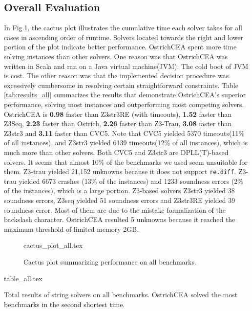 \documentclass{standalone}
\begin{document}
\subsection{Overall Evaluation}
In Fig.\ref{fig:cactus_all}, the cactus plot illustrates the cumulative time each solver takes for all cases in ascending order of runtime. Solvers located towards the right and lower portion of the plot indicate better performance. OstrichCEA spent more time solving instances than other solvers. One reason was that OstrichCEA was written in Scala and ran on a Java virtual machine(JVM). The cold boot of JVM is cost. The other reason was that the implemented decision procedure was excessively cumbersome in resolving certain straightforward constraints. \newline
Table \ref{tab:results_all} summarizes the results that demonstrate OstrichCEA's superior performance, solving most instances and outperforming most competing solvers. OstrichCEA is \textbf{0.98}\mult{} faster than Z3str3RE (with timeouts), \textbf{1.52}\mult{} faster than Z3Seq, \textbf{2.23}\mult{} faster than Ostrich, \textbf{2.26}\mult{} faster than Z3-Trau, \textbf{3.08}\mult{} faster than Z3str3 and \textbf{3.11}\mult{} faster than CVC5. Note that CVC5\cite{cvc5} yielded 5370 timeouts(11\% of all instances), and Z3str3\cite{z3str3} yielded 6139 timeouts(12\% of all instances), which is much more than other solvers. Both CVC5 and Z3str3 are DPLL(T)-based solvers. It seems that almost 10\% of the benchmarks we used seem unsuitable for them. Z3-trau\cite{z3trau} yielded 21,152 unknowns because it does not support \verb|re.diff|. Z3-trau\cite{z3trau} yielded 6673 crashes (13\% of the instances) and 1233 soundness errors (2\% of the instances), which is a large portion. Z3-based solvers Z3str3 yielded 38 soundness errors, Z3seq\cite{z3seq} yielded 51 soundness errors and Z3str3RE\cite{z3str3re} yielded 39 soundness error. Most of them are due to the mistake formalization of the backslash character. OstrichCEA resulted 5 unknowns because it reached the maximum threshold of limited memory 2GB.

\begin{figure}[h]
  \centering
  {cactus_plot_all.tex}
  \caption{Cactus plot summarizing performance on all benchmarks.}
  \label{fig:cactus_all}
\end{figure}
\begin{table}
  {table_all.tex}
  \caption{Total results of string solvers on all benchmarks. OstrichCEA solved the most benchmarks in the second shortest time.}
  \label{tab:results_all}
\end{table}
\end{document}
